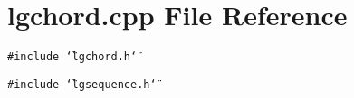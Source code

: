 \section{lgchord.cpp File Reference}
\label{lgchord_8cpp}
{\tt \#include \char`\"{}lgchord.h\char`\"{}}\par
{\tt \#include \char`\"{}lgsequence.h\char`\"{}}\par
